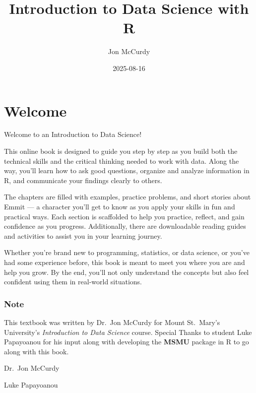 \documentclass[
  letterpaper,
  DIV=11,
  numbers=noendperiod]{scrreprt}
\title{Introduction to Data Science with R}
\author{Jon McCurdy}
\date{2025-08-16}
\renewcommand*\contentsname{Table of contents}
\newcommand\contentsname{Table of contents}
\begin{document}
\maketitle

\renewcommand*\contentsname{Table of contents}
{
\hypersetup{linkcolor=}
\setcounter{tocdepth}{2}
\tableofcontents
}


\chapter*{Welcome}\label{welcome}


Welcome to an Introduction to Data Science!

This online book is designed to guide you step by step as you build both
the technical skills and the critical thinking needed to work with data.
Along the way, you'll learn how to ask good questions, organize and
analyze information in R, and communicate your findings clearly to
others.

The chapters are filled with examples, practice problems, and short
stories about Emmit --- a character you'll get to know as you apply your
skills in fun and practical ways. Each section is scaffolded to help you
practice, reflect, and gain confidence as you progress. Additionally,
there are downloadable reading guides and activities to assist you in
your learning journey.

Whether you're brand new to programming, statistics, or data science, or
you've had some experience before, this book is meant to meet you where
you are and help you grow. By the end, you'll not only understand the
concepts but also feel confident using them in real-world situations.

\subsection*{Note}\label{note}

This textbook was written by Dr.~Jon McCurdy for Mount St.~Mary's
University's \emph{Introduction to Data Science} course. Special Thanks
to student Luke Papayoanou for his input along with developing the
\textbf{MSMU} package in R to go along with this book.

Dr.~Jon McCurdy

Luke Papayoanou
\end{document}

